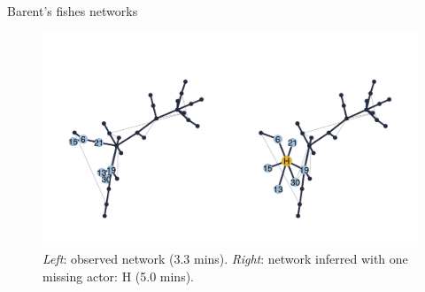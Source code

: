 \documentclass[11pt]{beamer}
\begin{document}
    \begin{frame}{Barent's fishes networks}
  \begin{figure}
  \includegraphics[width=0.9\linewidth]{images/Barents_net.png}
  \caption{\textit{Left}: observed network (3.3 mins). \textit{Right}: network inferred with one missing actor: H (5.0 mins).}
  \end{figure}
  \end{frame}
\end{document}
